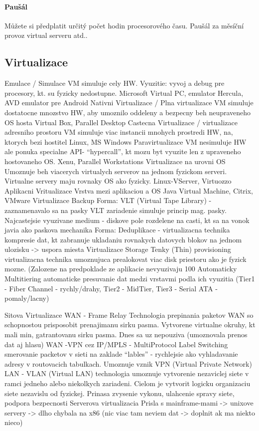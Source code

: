 \paragraph{Paušál} Můžete si předplatit určitý počet hodin procesorového času. Paušál za měsíční provoz virtual serveru atd..

\subsection{Virtualizace}
Emulace / Simulace 
VM simuluje cely HW. Vyuzitie: vyvoj a debug pre procesory, kt. su fyzicky nedostupne. 
Microsoft Virtual PC, emulator Hercula, AVD emulator pre Android
Nativni Virtualizace / Plna virtualizace
VM simuluje dostatocne mnozstvo HW, aby umoznilo oddeleny a bezpecny beh neupraveneho OS hosta
Virtual Box, Parallel Desktop
Castecna Virtualizace / virtualizace adresniho prostoru
VM simuluje viac instancii mnohych prostredi HW, na, ktorych bezi hostitel
Linux, MS Windows
Paravirtualizace
VM nesimuluje HW ale ponuka specialne API- “hypercall”, kt mozu byt vyuzite len z upraveneho hostovaneho OS.
Xenu, Parallel Workstations
Virtualizace na urovni OS
Umoznuje beh viacerych virtualych serverov na jednom fyzickom serveri. Virtualne servery maju rovnaky OS ako fyzicky.
Linux-VServer, Virtuozzo
Aplikacni Vritualizace
Vrstva mezi aplikaciou a OS
Java Virtual Machine, Citrix, VMware 
Virtualizace Backup
Forma: VLT (Virtual Tape Library) - zaznamenavalo sa na pasky 
VLT zariadenie simuluje princip mag. pasky. Najcastejsie vyuzivane medium - diskove pole rozdelene na casti, kt sa na vonok javia ako paskova mechanika
Forma: Deduplikace - virtualizacna technika kompresie dat, kt zabranuje ukladaniu rovnakych datovych blokov na jednom ulozisku -> uspora miesta
Virtualizace Storage 
Tenky (Thin) provisioning
virtualizacna technika umoznujuca prealokovat viac disk priestoru ako je fyzick mozne. (Zalozene na predpoklade ze aplikacie nevyuzivaju 100%
Automaticky Multitiering
automaticke presuvanie dat medzi vrstavmi podla ich vyuzitia (Tier1 - Fiber Channel - rychly/drahy, Tier2 - MidTier, Tier3 - Serial ATA - pomaly/lacny)



Sitova Virtualizace
WAN - Frame Relay
Technologia prepinania paketov WAN so schopnostou prisposobit prenajimanu sirku pasma. Vytvorene virtualne okruhy, kt mali min, gatrantovanu sirku pasma. Dnes sa uz nepouziva (umoznovala prenos dat aj hlasu)
WAN -VPN cez IP/MPLS - MultiProtocol Label Switching
smerovanie packetov v sieti na zaklade “lables” - rychlejsie ako vyhladavanie adresy v routovacich tabulkach. Umoznuje vznik VPN (Virtual Private Network)
LAN - VLAN (Virtual LAN)
technologia umoznuje vytvorenie nezaviclej siete v ramci jedneho alebo niekolkych zariadeni. Cielom je vytvorit logicku organizaciu siete nezavislu od fyzickej. Prinasa zvysenie vykonu, ulahcenie spravy siete, podpora bezpecnosti
Serverova virtualizacia
Prisla s mainframe-mami -> unixove servery -> dlho chybala na x86
(nic viac tam neviem dat -> doplnit ak ma niekto nieco)

